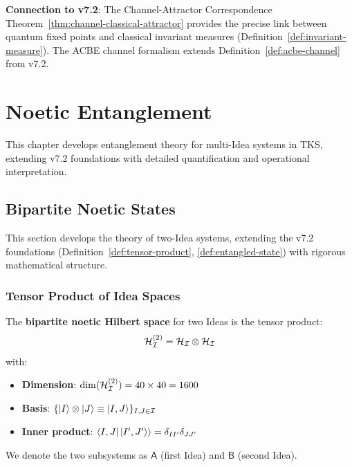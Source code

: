 \begin{tcolorbox}[colback=green!5!white,colframe=green!50!black,title=\textbf{Handoff: Next Steps},breakable]
\textbf{Connection to v7.2}: The Channel-Attractor Correspondence Theorem~\ref{thm:channel-classical-attractor} provides the precise link between quantum fixed points and classical invariant measures (Definition~\ref{def:invariant-measure}). The ACBE channel formalism extends Definition~\ref{def:acbe-channel} from v7.2.
\end{tcolorbox}

\chapter{Noetic Entanglement}
\label{ch:noetic-entanglement}

\begin{tcolorbox}[colback=blue!5!white,colframe=blue!75!black,title=\vnewthree]
This chapter develops entanglement theory for multi-Idea systems in TKS, extending v7.2 foundations with detailed quantification and operational interpretation.
\end{tcolorbox}

\section{Bipartite Noetic States}
\label{sec:bipartite-states}

This section develops the theory of two-Idea systems, extending the v7.2 foundations (Definition~\ref{def:tensor-product}, \ref{def:entangled-state}) with rigorous mathematical structure.

\subsection{Tensor Product of Idea Spaces}

\begin{definition}
\label{def:bipartite-hilbert}
The \textbf{bipartite noetic Hilbert space} for two Ideas is the tensor product:
\[
\mathcal{H}_{\mathcal{I}}^{(2)} = \mathcal{H}_{\mathcal{I}} \otimes \mathcal{H}_{\mathcal{I}}
\]
with:
\begin{itemize}
  \item \textbf{Dimension}: $\dim(\mathcal{H}_{\mathcal{I}}^{(2)}) = 40 \times 40 = 1600$
  \item \textbf{Basis}: $\{|I\rangle \otimes |J\rangle \equiv |I, J\rangle\}_{I, J \in \mathcal{I}}$
  \item \textbf{Inner product}: $\langle I, J|\ket{I', J'}\rangle = \delta_{II'} \delta_{JJ'}$
\end{itemize}
We denote the two subsystems as $\mathsf{A}$ (first Idea) and $\mathsf{B}$ (second Idea).
\end{definition}

